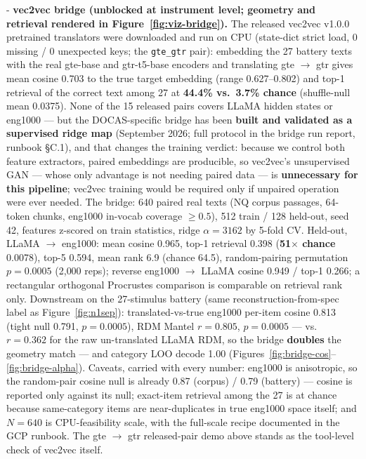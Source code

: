 \documentclass[11pt,twocolumn]{article}
\theoremstyle{plain}
\begin{document}
\begin{itemize}
- \textbf{vec2vec bridge (unblocked at instrument level; geometry and retrieval rendered in Figure~\ref{fig:viz-bridge}).} The released vec2vec v1.0.0 pretrained translators \citep{jha2025} were downloaded and run on CPU (state-dict strict load, 0 missing / 0 unexpected keys; the \texttt{gte\_gtr} pair): embedding the 27 battery texts with the real gte-base and gtr-t5-base encoders and translating gte $\to$ gtr gives mean cosine 0.703 to the true target embedding (range 0.627--0.802) and top-1 retrieval of the correct text among 27 at \textbf{44.4\% vs.\ 3.7\% chance} (shuffle-null mean 0.0375). None of the 15 released pairs covers LLaMA hidden states or eng1000 --- but the DOCAS-specific bridge has been \textbf{built and validated as a supervised ridge map} (September 2026; full protocol in the bridge run report, runbook \S{}C.1), and that changes the training verdict: because we control both feature extractors, paired embeddings are producible, so vec2vec's unsupervised GAN --- whose only advantage is not needing paired data --- is \textbf{unnecessary for this pipeline}; vec2vec training would be required only if unpaired operation were ever needed. The bridge: 640 paired real texts (NQ corpus passages, 64-token chunks, eng1000 in-vocab coverage $\geq 0.5$), 512 train / 128 held-out, seed 42, features z-scored on train statistics, ridge $\alpha = 3162$ by 5-fold CV. Held-out, LLaMA $\to$ eng1000: mean cosine 0.965, top-1 retrieval 0.398 (\textbf{51$\times$ chance} 0.0078), top-5 0.594, mean rank 6.9 (chance 64.5), random-pairing permutation $p = 0.0005$ (2{,}000 reps); reverse eng1000 $\to$ LLaMA cosine 0.949 / top-1 0.266; a rectangular orthogonal Procrustes comparison is comparable on retrieval rank only. Downstream on the 27-stimulus battery (same reconstruction-from-spec label as Figure~\ref{fig:n1sep}): translated-vs-true eng1000 per-item cosine 0.813 (tight null 0.791, $p = 0.0005$), RDM Mantel $r = 0.805$, $p = 0.0005$ --- vs.\ $r = 0.362$ for the raw un-translated LLaMA RDM, so the bridge \textbf{doubles} the geometry match --- and category LOO decode 1.00 (Figures~\ref{fig:bridge-cos}--\ref{fig:bridge-alpha}). Caveats, carried with every number: eng1000 is anisotropic, so the random-pair cosine null is already 0.87 (corpus) / 0.79 (battery) --- cosine is reported only against its null; exact-item retrieval among the 27 is at chance because same-category items are near-duplicates in true eng1000 space itself; and $N = 640$ is CPU-feasibility scale, with the full-scale recipe documented in the GCP runbook. The gte $\to$ gtr released-pair demo above stands as the tool-level check of vec2vec itself.

\end{itemize}
\end{document}
